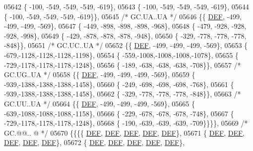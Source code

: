 \begin{DoxyCode}
05642 \{ -100, -549, -549, -549, -619\},
05643 \{ -100, -549, -549, -549, -619\},
05644 \{ -100, -549, -549, -549, -619\}\},
05645 \textcolor{comment}{/* GC.UA..UA */}
05646 \{\{  \mbox{\hyperlink{1_88_84__epars_8h_a397419fc12b37ed479c8abb9d444d843}{DEF}}, -499, -499, -499, -569\},
05647 \{ -449, -898, -898, -898, -968\},
05648 \{ -479, -928, -928, -928, -998\},
05649 \{ -429, -878, -878, -878, -948\},
05650 \{ -329, -778, -778, -778, -848\}\},
05651 \textcolor{comment}{/* GC.UC..UA */}
05652 \{\{  \mbox{\hyperlink{1_88_84__epars_8h_a397419fc12b37ed479c8abb9d444d843}{DEF}}, -499, -499, -499, -569\},
05653 \{ -679,-1128,-1128,-1128,-1198\},
05654 \{ -559,-1008,-1008,-1008,-1078\},
05655 \{ -729,-1178,-1178,-1178,-1248\},
05656 \{ -189, -638, -638, -638, -708\}\},
05657 \textcolor{comment}{/* GC.UG..UA */}
05658 \{\{  \mbox{\hyperlink{1_88_84__epars_8h_a397419fc12b37ed479c8abb9d444d843}{DEF}}, -499, -499, -499, -569\},
05659 \{ -939,-1388,-1388,-1388,-1458\},
05660 \{ -249, -698, -698, -698, -768\},
05661 \{ -939,-1388,-1388,-1388,-1458\},
05662 \{ -329, -778, -778, -778, -848\}\},
05663 \textcolor{comment}{/* GC.UU..UA */}
05664 \{\{  \mbox{\hyperlink{1_88_84__epars_8h_a397419fc12b37ed479c8abb9d444d843}{DEF}}, -499, -499, -499, -569\},
05665 \{ -639,-1088,-1088,-1088,-1158\},
05666 \{ -229, -678, -678, -678, -748\},
05667 \{ -729,-1178,-1178,-1178,-1248\},
05668 \{ -190, -639, -639, -639, -709\}\}\}\},
05669 \textcolor{comment}{/* GC.@@.. @ */}
05670 \{\{\{\{  \mbox{\hyperlink{1_88_84__epars_8h_a397419fc12b37ed479c8abb9d444d843}{DEF}},  \mbox{\hyperlink{1_88_84__epars_8h_a397419fc12b37ed479c8abb9d444d843}{DEF}},  \mbox{\hyperlink{1_88_84__epars_8h_a397419fc12b37ed479c8abb9d444d843}{DEF}},  \mbox{\hyperlink{1_88_84__epars_8h_a397419fc12b37ed479c8abb9d444d843}{DEF}},  \mbox{\hyperlink{1_88_84__epars_8h_a397419fc12b37ed479c8abb9d444d843}{DEF}}\},
05671 \{  \mbox{\hyperlink{1_88_84__epars_8h_a397419fc12b37ed479c8abb9d444d843}{DEF}},  \mbox{\hyperlink{1_88_84__epars_8h_a397419fc12b37ed479c8abb9d444d843}{DEF}},  \mbox{\hyperlink{1_88_84__epars_8h_a397419fc12b37ed479c8abb9d444d843}{DEF}},  \mbox{\hyperlink{1_88_84__epars_8h_a397419fc12b37ed479c8abb9d444d843}{DEF}},  \mbox{\hyperlink{1_88_84__epars_8h_a397419fc12b37ed479c8abb9d444d843}{DEF}}\},
05672 \{  \mbox{\hyperlink{1_88_84__epars_8h_a397419fc12b37ed479c8abb9d444d843}{DEF}},  \mbox{\hyperlink{1_88_84__epars_8h_a397419fc12b37ed479c8abb9d444d843}{DEF}},  \mbox{\hyperlink{1_88_84__epars_8h_a397419fc12b37ed479c8abb9d444d843}{DEF}},  \mbox{\hyperlink{1_88_84__epars_8h_a397419fc12b37ed479c8abb9d444d843}{DEF}},  \mbox{\hyperlink{1_88_84__epars_8h_a397419fc12b37ed479c8abb9d444d843}{DEF}}\},

\end{DoxyCode}
